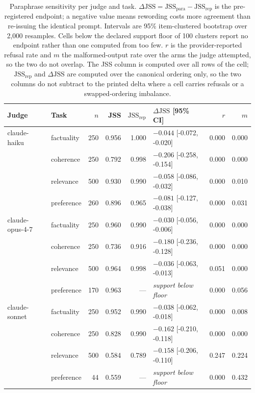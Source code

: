 \begin{table}[t]
\centering
\caption{Paraphrase sensitivity per judge and task. $\Delta\mathrm{JSS} = \mathrm{JSS}_{\text{para}} - \mathrm{JSS}_{\text{rep}}$ is the pre-registered endpoint; a negative value means rewording costs more agreement than re-issuing the identical prompt. Intervals are 95\% item-clustered bootstrap over 2{,}000 resamples. Cells below the declared support floor of 100 clusters report no endpoint rather than one computed from too few. $r$ is the provider-reported refusal rate and $m$ the malformed-output rate over the arms the judge attempted, so the two do not overlap. The JSS column is computed over all rows of the cell; $\mathrm{JSS}_{\text{rep}}$ and $\Delta\mathrm{JSS}$ are computed over the canonical ordering only, so the two columns do not subtract to the printed delta where a cell carries refusals or a swapped-ordering imbalance.}
\label{tab:main}
\begin{tabular}{llrrrlrr}
\toprule
Judge & Task & $n$ & JSS & $\mathrm{JSS}_{\text{rep}}$ & $\Delta\mathrm{JSS}$ [95\% CI] & $r$ & $m$ \\
\midrule
claude-haiku & factuality & 250 & 0.956 & 1.000 & $-0.044$ [-0.072, -0.020] & 0.000 & 0.000 \\
 & coherence & 250 & 0.792 & 0.998 & $-0.206$ [-0.258, -0.154] & 0.000 & 0.000 \\
 & relevance & 500 & 0.930 & 0.990 & $-0.058$ [-0.086, -0.032] & 0.000 & 0.010 \\
 & preference & 260 & 0.896 & 0.965 & $-0.081$ [-0.127, -0.038] & 0.000 & 0.031 \\
\addlinespace
claude-opus-4-7 & factuality & 250 & 0.960 & 0.990 & $-0.030$ [-0.056, -0.006] & 0.000 & 0.000 \\
 & coherence & 250 & 0.736 & 0.916 & $-0.180$ [-0.236, -0.128] & 0.000 & 0.000 \\
 & relevance & 500 & 0.964 & 0.998 & $-0.036$ [-0.063, -0.013] & 0.051 & 0.000 \\
 & preference & 170 & 0.963 & --- & \emph{support below floor} & 0.000 & 0.056 \\
\addlinespace
claude-sonnet & factuality & 250 & 0.952 & 0.990 & $-0.038$ [-0.062, -0.018] & 0.000 & 0.008 \\
 & coherence & 250 & 0.828 & 0.990 & $-0.162$ [-0.210, -0.118] & 0.000 & 0.000 \\
 & relevance & 500 & 0.584 & 0.789 & $-0.158$ [-0.206, -0.110] & 0.247 & 0.224 \\
 & preference & 44 & 0.559 & --- & \emph{support below floor} & 0.000 & 0.432 \\

\end{tabular}
\end{table}
